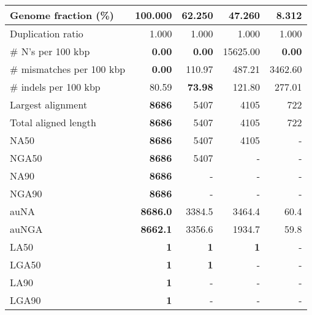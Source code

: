 \documentclass[12pt,a4paper]{article}
\begin{document}
\begin{table}[ht]
\begin{center}
\begin{tabular}{|l*{4}{|r}|}
Genome fraction (\%) & {\bf 100.000} & 62.250 & 47.260 & 8.312 \\ \hline
Duplication ratio & 1.000 & 1.000 & 1.000 & 1.000 \\ \hline
\# N's per 100 kbp & {\bf 0.00} & {\bf 0.00} & 15625.00 & {\bf 0.00} \\ \hline
\# mismatches per 100 kbp & {\bf 0.00} & 110.97 & 487.21 & 3462.60 \\ \hline
\# indels per 100 kbp & 80.59 & {\bf 73.98} & 121.80 & 277.01 \\ \hline
Largest alignment & {\bf 8686} & 5407 & 4105 & 722 \\ \hline
Total aligned length & {\bf 8686} & 5407 & 4105 & 722 \\ \hline
NA50 & {\bf 8686} & 5407 & 4105 & - \\ \hline
NGA50 & {\bf 8686} & 5407 & - & - \\ \hline
NA90 & {\bf 8686} & - & - & - \\ \hline
NGA90 & {\bf 8686} & - & - & - \\ \hline
auNA & {\bf 8686.0} & 3384.5 & 3464.4 & 60.4 \\ \hline
auNGA & {\bf 8662.1} & 3356.6 & 1934.7 & 59.8 \\ \hline
LA50 & {\bf 1} & {\bf 1} & {\bf 1} & - \\ \hline
LGA50 & {\bf 1} & {\bf 1} & - & - \\ \hline
LA90 & {\bf 1} & - & - & - \\ \hline
LGA90 & {\bf 1} & - & - & - \\ \hline
\end{tabular}
\end{center}
\end{table}
\end{document}
